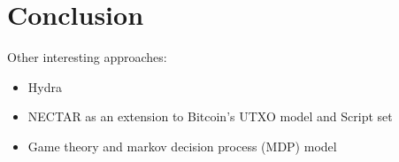 \documentclass{llncs}
\begin{document}
\section{Conclusion}
\label{conclusion}

Other interesting approaches:
\begin{itemize}
\item Hydra \cite{Breidenbach2018}
\item NECTAR as an extension to Bitcoin's UTXO model and Script set \cite{Covaci2018}
\item Game theory and markov decision process (MDP) model \cite{Bigi2015}
\end{itemize}



\printbibliography
\end{document}
